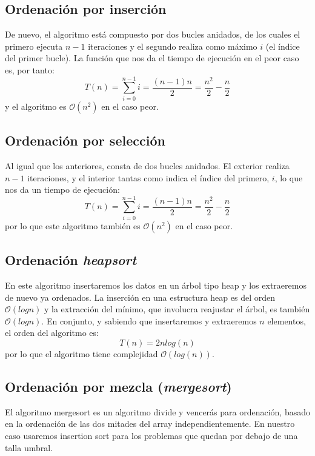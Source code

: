 \documentclass[a4paper, 11pt]{article} %
\begin{document}
\subsection{Ordenación por inserción}
De nuevo, el algoritmo está compuesto por dos bucles anidados, de los cuales el primero ejecuta $n-1$ iteraciones y el segundo realiza como máximo $i$ (el índice del primer bucle). La función que nos da el tiempo de ejecución en el peor caso es, por tanto:
\begin{equation}
 T(n) = \sum_{i=0}^{n-1} i = \frac{(n-1)n}{2} = \frac{n^2}{2} - \frac{n}{2}
\end{equation}
y el algoritmo es $\mathcal{O}(n^2)$ en el caso peor.
\subsection{Ordenación por selección}
Al igual que los anteriores, consta de dos bucles anidados. El exterior realiza $n-1$ iteraciones, y el interior tantas como indica el índice del primero, $i$, lo que nos da un tiempo de ejecución:
\begin{equation}
 T(n) = \sum_{i=0}^{n-1} i = \frac{(n-1)n}{2} = \frac{n^2}{2} - \frac{n}{2}
\end{equation}
por lo que este algoritmo también es $\mathcal{O}(n^2)$ en el caso peor.

\subsection{Ordenación \textit{heapsort}}
En este algoritmo insertaremos los datos en un árbol tipo heap y los extraeremos de nuevo ya ordenados.
La inserción en una estructura heap es del orden $\mathcal{O}(log n)$ y la extracción del mínimo, que involucra
reajustar el árbol, es también $\mathcal{O}(log n)$. En conjunto, y sabiendo que insertaremos y extraeremos $n$ elementos,
el orden del algoritmo es:
\begin{equation}
 T(n) = 2 n log(n)
\end{equation}
por lo que el algoritmo tiene complejidad $\mathcal{O}(log(n))$.


\subsection{Ordenación por mezcla (\textit{mergesort})}
El algoritmo mergesort es un algoritmo divide y vencerás para ordenación, basado en la ordenación de las dos mitades del
array independientemente. En nuestro caso usaremos insertion sort para los problemas que quedan por debajo de una talla umbral.
\end{document}
